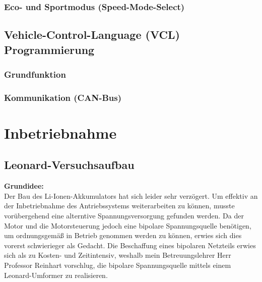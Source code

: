 \subsubsection{Eco- und Sportmodus (Speed-Mode-Select)}

\newpage




\subsection{Vehicle-Control-Language (VCL) Programmierung}
\subsubsection{Grundfunktion}
\subsubsection{Kommunikation (CAN-Bus)}

\newpage

\section{Inbetriebnahme}
\subsection{Leonard-Versuchsaufbau}
\textbf{Grundidee:}
\\[2mm]
Der Bau des Li-Ionen-Akkumulators hat sich leider sehr verzögert. Um effektiv an der Inbetriebnahme des Antriebssystems weiterarbeiten zu können, musste vorübergehend eine alterntive Spannungsversorgung gefunden werden. Da der Motor und die Motorsteuerung jedoch eine bipolare Spannungsquelle benötigen, um ordnungsgemäß in Betrieb genommen werden zu können, erwies sich dies vorerst schwierieger als Gedacht. Die Beschaffung eines bipolaren Netzteils erwies sich als zu Kosten- und Zeitintensiv, weshalb mein Betreuungslehrer Herr Professor Reinhart vorschlug, die bipolare Spannungsquelle mittels einem Leonard-Umformer zu realisieren.
\\[5mm]

